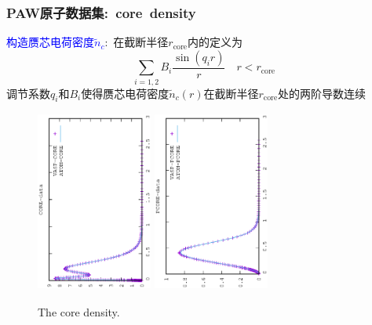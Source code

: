 \documentclass[cjk,slidestop,compress,mathserif,blue]{beamer}
\begin{document}
\frame
{
	\frametitle{\textrm{PAW}原子数据集:~\textrm{core~density}}
	\textcolor{blue}{构造赝芯电荷密度$\tilde n_c$}:~在截断半径$r_{\mathrm{core}}$内的定义为
	$$\sum_{i=1,2}B_i\dfrac{\sin(q_ir)}r\quad r<r_{\mathrm{core}}$$
	调节系数$q_i$和$B_i$使得赝芯电荷密度$\tilde n_c(r)$在截断半径$r_{\mathrm{core}}$处的两阶导数连续
\begin{figure}[h!]
\vskip -0.5in
\centering
\hspace*{-0.1in}
\includegraphics[width=1.5in,height=2.35in,viewport=0 0 350 550, angle=-90, clip]{Figures/CORE-data.eps}
\hspace*{-0.7in}
\includegraphics[height=2.35in,width=1.5in,viewport=0 0 350 550, angle=-90, clip]{Figures/PCORE-data.eps}
\caption{\tiny \textrm{The core density.}}%
\label{core_density_Function}
\end{figure}
}
\end{document}
